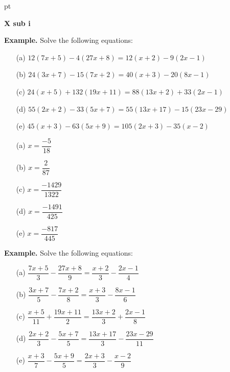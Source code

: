 \documentclass[12pt]{article}
\begin{document}
 pt
\begin{center}
	{\large \bf X sub i}\\
	\vspace{2 mm}

\end{center}
\vspace{0.05cm}

\textbf{Example.} Solve the following equations:
\begin{enumerate}
	\item[(a)] $12(7x + 5) - 4(27x + 8) = 12(x + 2) - 9(2x - 1)$
	\item[(b)] $24(3x + 7) - 15(7x + 2) = 40(x + 3) - 20(8x - 1)$
	\item[(c)] $24(x + 5) + 132(19x + 11) = 88(13x + 2) + 33(2x - 1)$
	\item[(d)] $55(2x + 2) - 33(5x + 7) = 55(13x + 17) - 15(23x - 29)$
	\item[(e)] $45(x + 3) - 63(5x + 9) = 105(2x + 3) - 35(x - 2)$
\end{enumerate}

\vfill

\begin{enumerate}
	\item[(a)] $x = \dfrac{-5}{18}$
	\item[(b)] $x = \dfrac{2}{87}$
	\item[(c)] $x = \dfrac{-1429}{1322}$
	\item[(d)] $x = \dfrac{-1491}{425}$
	\item[(e)] $x = \dfrac{-817}{445}$
\end{enumerate}

\newpage

\textbf{Example.} Solve the following equations:
\begin{enumerate}
	\item[(a)] $\dfrac{7x + 5}{3} - \dfrac{27x + 8}{9} = \dfrac{x + 2}{3} - \dfrac{2x - 1}{4}$
	\item[(b)] $\dfrac{3x + 7}{5} - \dfrac{7x + 2}{8} = \dfrac{x + 3}{3} - \dfrac{8x - 1}{6}$
	\item[(c)] $\dfrac{x + 5}{11} + \dfrac{19x + 11}{2} = \dfrac{13x + 2}{3} + \dfrac{2x - 1}{8}$
	\item[(d)] $\dfrac{2x + 2}{3} - \dfrac{5x + 7}{5} = \dfrac{13x + 17}{3} - \dfrac{23x - 29}{11}$
	\item[(e)] $\dfrac{x + 3}{7} - \dfrac{5x + 9}{5} = \dfrac{2x + 3}{3} - \dfrac{x - 2}{9}$
\end{enumerate}
\end{document}
